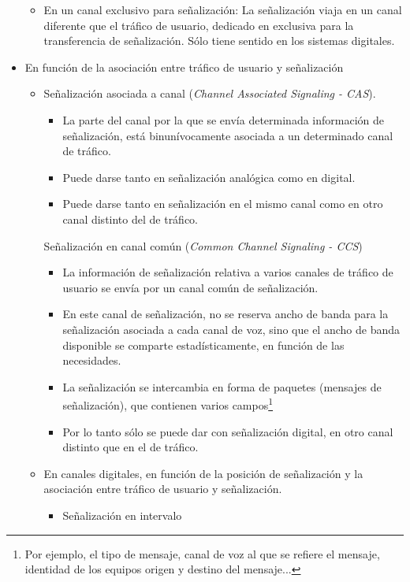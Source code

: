\documentclass[10pt,portrait, twocolumn]{article}
\begin{document}
\begin{itemize}
\begin{itemize}
\begin{itemize}
		\end{itemize} 
	\item En un canal exclusivo para señalización: La señalización viaja en un canal diferente que el tráfico de usuario, dedicado en exclusiva para la transferencia de señalización. Sólo tiene sentido en los sistemas digitales.
	\end{itemize}
\item En función de la asociación entre tráfico de usuario y señalización
	\begin{itemize}
	\item Señalización asociada a canal (\textit{Channel Associated Signaling - CAS}).
		\begin{itemize}
		\item La parte del canal por la que se envía determinada información de señalización, está binunívocamente asociada a un determinado canal de tráfico.
		\item Puede darse tanto en señalización analógica como en digital.
		\item Puede darse tanto en señalización en el mismo canal como en otro canal distinto del de tráfico.
		\end{itemize}
	Señalización en canal común (\textit{Common Channel Signaling - CCS})
		\begin{itemize}
		\item La información de señalización relativa a varios canales de tráfico de usuario se envía por un canal común de señalización.
		\item En este canal de señalización, no se reserva ancho de banda para la señalización asociada a cada canal de voz, sino que el ancho de banda disponible se comparte estadísticamente, en función de las necesidades.
		\item La señalización se intercambia en forma de paquetes (mensajes de señalización), que contienen varios campos\footnote{Por ejemplo, el tipo de mensaje, canal de voz al que se refiere el mensaje, identidad de los equipos origen y destino del mensaje...}
		\item Por lo tanto sólo se puede dar con señalización digital, en otro canal distinto que en el de tráfico.
		\end{itemize}
		\item En canales digitales, en función de la posición de señalización y la asociación entre tráfico de usuario y señalización.
			\begin{itemize}
			\item Señalización en intervalo

\end{itemize}
\end{itemize}
\end{itemize}
\end{document}

